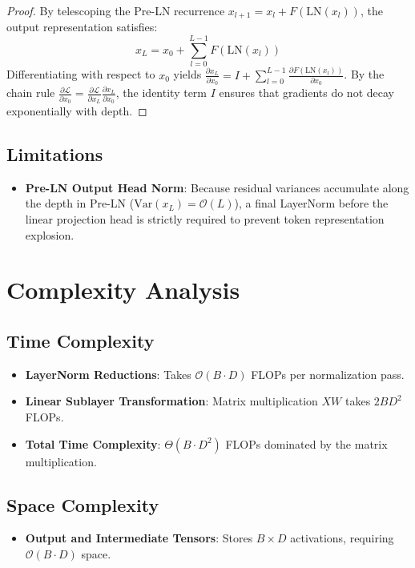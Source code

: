 \documentclass[11pt,a4paper]{article}
\theoremstyle{definition}
\begin{document}
\begin{proof}
By telescoping the Pre-LN recurrence $x_{l+1} = x_l + F(\text{LN}(x_l))$, the output representation satisfies:
\begin{equation}
x_L = x_0 + \sum_{l=0}^{L-1} F(\text{LN}(x_l))
\end{equation}
Differentiating with respect to $x_0$ yields $\frac{\partial x_L}{\partial x_0} = I + \sum_{l=0}^{L-1} \frac{\partial F(\text{LN}(x_l))}{\partial x_0}$. By the chain rule $\frac{\partial \mathcal{L}}{\partial x_0} = \frac{\partial \mathcal{L}}{\partial x_L} \frac{\partial x_L}{\partial x_0}$, the identity term $I$ ensures that gradients do not decay exponentially with depth.
\end{proof}

\subsection{Limitations}
\begin{itemize}
    \item \textbf{Pre-LN Output Head Norm}: Because residual variances accumulate along the depth in Pre-LN ($\text{Var}(x_L) = \mathcal{O}(L)$), a final LayerNorm before the linear projection head is strictly required to prevent token representation explosion.
\end{itemize}

\section{Complexity Analysis}

\subsection{Time Complexity}
\begin{itemize}
    \item \textbf{LayerNorm Reductions}: Takes $\mathcal{O}(B \cdot D)$ FLOPs per normalization pass.
    \item \textbf{Linear Sublayer Transformation}: Matrix multiplication $X W$ takes $2 B D^2$ FLOPs.
    \item \textbf{Total Time Complexity}: $\Theta(B \cdot D^2)$ FLOPs dominated by the matrix multiplication.
\end{itemize}

\subsection{Space Complexity}
\begin{itemize}
    \item \textbf{Output and Intermediate Tensors}: Stores $B \times D$ activations, requiring $\mathcal{O}(B \cdot D)$ space.
\end{itemize}
\end{document}
